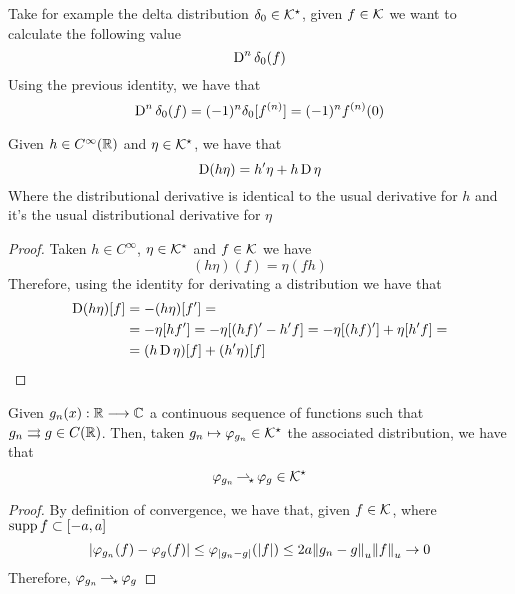 \documentclass[../complete.tex]{subfiles}
\begin{document}
\begin{eg}
	Take for example the delta distribution $\delta_0\in\mathcal{K}^\star$, given $f\in\mathcal{K}$ we want to calculate the following value
	\begin{equation*}
		\operatorname{\mathrm{D}}^n\delta_0(f)
	\end{equation*}
	Using the previous identity, we have that
	\begin{equation*}
		\operatorname{\mathrm{D}}^n\delta_0(f)=(-1)^n\delta_0[f^{(n)}]=(-1)^nf^{(n)}(0)
	\end{equation*}
\end{eg}
\begin{thm}
	Given $h\in C^\infty(\mathbb{R})$ and $\eta\in\mathcal{K}^\star$, we have that
	\begin{equation*}
		\operatorname{\mathrm{D}}(h\eta)=h'\eta+h\operatorname{\mathrm{D}}\eta
	\end{equation*}
	Where the distributional derivative is identical to the usual derivative for $h$ and it's the usual distributional derivative for $\eta$
\end{thm}
\begin{proof}
	Taken $h\in C^\infty$, $\eta\in\mathcal{K}^\star$ and $f\in\mathcal{K}$ we have
	\begin{equation*}
		(h\eta)(f)=\eta(fh)
	\end{equation*}
	Therefore, using the identity for derivating a distribution we have that
	\begin{equation*}
		\begin{aligned}
			\operatorname{\mathrm{D}}(h\eta)[f]&=-(h\eta)[f']=\\
			&=-\eta[hf']=-\eta[(hf)'-h'f]=-\eta[(hf)']+\eta[h'f]=\\
			&=(h\operatorname{\mathrm{D}}\eta)[f]+(h'\eta)[f]
		\end{aligned}
	\end{equation*}
\end{proof}
\begin{thm}
	Given $g_n(x):\mathbb{R}\overset{}{\longrightarrow}\mathbb{C}$ a continuous sequence of functions such that $g_n\rightrightarrows g\in C(\mathbb{R})$. Then, taken $g_n\mapsto\varphi_{g_n}\in\mathcal{K}^\star$ the associated distribution, we have that
	\begin{equation*}
		\varphi_{g_n}\operatorname{\rightharpoonup_{\!\star}}\varphi_g\in\mathcal{K}^\star
	\end{equation*}
\end{thm}
\begin{proof}
	By definition of convergence, we have that, given $f\in\mathcal{K}$, where $\operatorname{supp} f\subset[-a,a]$
	\begin{equation*}
		\abs{\varphi_{g_n}(f)-\varphi_g(f)}\le\varphi_{\abs{g_n-g}}(\abs{f})\le2a\norm{g_n-g}_u\norm{f}_u\to0
	\end{equation*}
	Therefore, $\varphi_{g_n}\operatorname{\rightharpoonup_{\!\star}}\varphi_g$
\end{proof}
\end{document}
